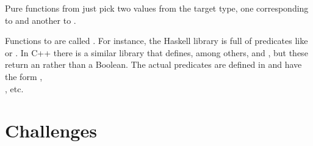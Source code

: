 Pure functions from  just pick two values from the target
type, one corresponding to  and another to .

Functions to  are called . For instance,
the Haskell library  is full of predicates like
 or . In C++ there is a similar library
\code{} that defines, among others,  and
, but these return an  rather than a
Boolean. The actual predicates are defined in  and
have the form ,\\
, etc.

\section{Challenges}

